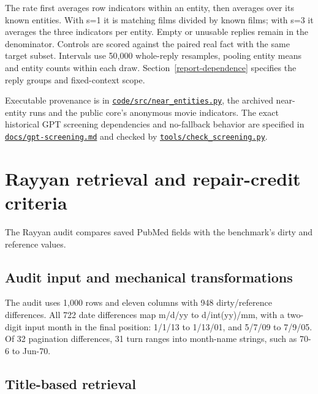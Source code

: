 \documentclass[10pt,a4paper]{article}
\begin{document}
The rate first averages row indicators within an entity, then averages over its known entities. With s=1 it is matching films divided by known films; with s=3 it averages the three indicators per entity. Empty or unusable replies remain in the denominator. Controls are scored against the paired real fact with the same target subset. Intervals use 50,000 whole-reply resamples, pooling entity means and entity counts within each draw. Section~\ref{report-dependence} specifies the reply groups and fixed-context scope.

Executable provenance is in \href{https://github.com/hinsonver/CoRe-Benchmark/blob/main/code/src/near_entities.py}{\nolinkurl{code/src/near_entities.py}}, the archived near-entity runs and the public core's anonymous movie indicators. The exact historical GPT screening dependencies and no-fallback behavior are specified in \href{https://github.com/hinsonver/CoRe-Benchmark/blob/main/docs/gpt-screening.md}{\nolinkurl{docs/gpt-screening.md}} and checked by \href{https://github.com/hinsonver/CoRe-Benchmark/blob/main/tools/check_screening.py}{\nolinkurl{tools/check_screening.py}}.
\clearpage
\section{Rayyan retrieval and repair-credit criteria}
\hypertarget{companion-3}{}\label{report-3}

The Rayyan audit compares saved PubMed fields with the benchmark's dirty and reference values.

\subsection{Audit input and mechanical transformations}

The audit uses 1,000 rows and eleven columns with 948 dirty/reference differences. All 722 date differences map {\ttfamily\small m/\allowbreak{}d/\allowbreak{}yy} to {\ttfamily\small d/\allowbreak{}int(yy)/\allowbreak{}mm}, with a two-digit input month in the final position: {\ttfamily\small 1/\allowbreak{}1/\allowbreak{}13} to {\ttfamily\small 1/\allowbreak{}13/\allowbreak{}01}, and {\ttfamily\small 5/\allowbreak{}7/\allowbreak{}09} to {\ttfamily\small 7/\allowbreak{}9/\allowbreak{}05}. Of 32 pagination differences, 31 turn ranges into month-name strings, such as {\ttfamily\small 70-6} to {\ttfamily\small Jun-70}.

\subsection{Title-based retrieval}
\end{document}
